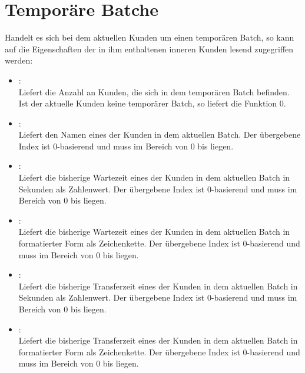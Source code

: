 \section{Temporäre Batche}

Handelt es sich bei dem aktuellen Kunden um einen temporären Batch, so kann auf die
Eigenschaften der in ihm enthaltenen inneren Kunden lesend zugegriffen werden:

\begin{itemize}

\item
{}:\\
Liefert die Anzahl an Kunden, die sich in dem temporären Batch befinden.
Ist der aktuelle Kunden keine temporärer Batch, so liefert die Funktion 0.

\item
{}:\\
Liefert den Namen eines der Kunden in dem aktuellen Batch.
Der übergebene Index ist 0-basierend und muss im Bereich von 0 bis  liegen.

\item
{}:\\
Liefert die bisherige Wartezeit eines der Kunden in dem aktuellen Batch in Sekunden als Zahlenwert.
Der übergebene Index ist 0-basierend und muss im Bereich von 0 bis  liegen.
	

\item
{}:\\
Liefert die bisherige Wartezeit eines der Kunden in dem aktuellen Batch in formatierter Form als Zeichenkette.
Der übergebene Index ist 0-basierend und muss im Bereich von 0 bis  liegen.

\item
{}:\\
Liefert die bisherige Transferzeit eines der Kunden in dem aktuellen Batch in Sekunden als Zahlenwert.
Der übergebene Index ist 0-basierend und muss im Bereich von 0 bis  liegen.

\item
{}:\\
Liefert die bisherige Transferzeit eines der Kunden in dem aktuellen Batch in formatierter Form als Zeichenkette.
Der übergebene Index ist 0-basierend und muss im Bereich von 0 bis  liegen.


\end{itemize}
